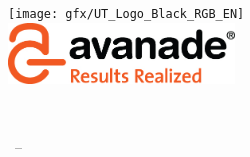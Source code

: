 \begin{titlepage}
	\begin{addmargin}[-1cm]{-3cm}
    \begin{center}
        \large  

        \hfill

        \vfill

        \begingroup
            \color{Maroon}\spacedallcaps{\myTitle} \\ \bigskip
        \endgroup

        \spacedlowsmallcaps{\myName\myDegree} \\
        \myDepartment \\                            
        \myFaculty \\
        \myUni \\ \bigskip

        \vfill

        \texttt{[image: gfx/UT\_Logo\_Black\_RGB\_EN]} \\
        \includegraphics[width=6cm]{gfx/ava_tag_color_rgb} \\ \medskip

        \mySubtitle \\ \medskip   

        \myTime\ -- \myVersion

        \vfill                      

    \end{center}  
  \end{addmargin}       
\end{titlepage}   